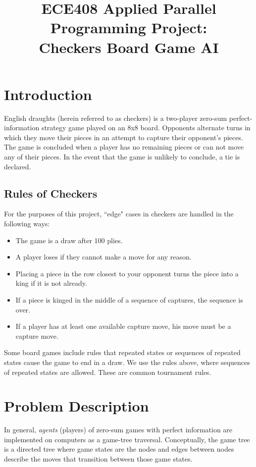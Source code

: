 \documentclass[11pt]{article}
\begin{document}
\setlength{\baselineskip}{14pt}

\title{ECE408 Applied Parallel Programming Project: \\
       Checkers Board Game AI}

\maketitle

\newpage
\tableofcontents

\newpage
\section{Introduction}
English draughts (herein referred to as checkers) is a two-player zero-sum
perfect-information strategy game played on an 8x8 board. Opponents alternate
turns in which they move their pieces in an attempt to capture their opponent's
pieces.  The game is concluded when a player has no remaining pieces or can not
move any of their pieces.  In the event that the game is unlikely to conclude, a
tie is declared.

\subsection{Rules of Checkers}
For the purposes of this project, ``edge" cases in checkers are handled in the
following ways:

\begin{itemize}
  \item{The game is a draw after 100 plies.}
  \item{A player loses if they cannot make a move for any reason.}
  \item{Placing a piece in the row closest to your opponent turns the piece
into a king if it is not already.}
  \item{If a piece is kinged in the middle of a sequence of captures, the sequence is over.}
  \item{If a player has at least one available capture move, his move must be a capture move.}
\end{itemize}

Some board games include rules that repeated states or sequences of repeated
states cause the game to end in a draw. We use the rules above, where sequences
of repeated states are allowed. These are common tournament rules.

\newpage
\section{Problem Description}
In general, \textit{agents} (players) of zero-sum games with perfect
information are implemented on computers as a game-tree traversal.
Conceptually, the game tree is a directed tree where game states are the nodes
and edges between nodes describe the moves that transition between those game
states.
\end{document}
